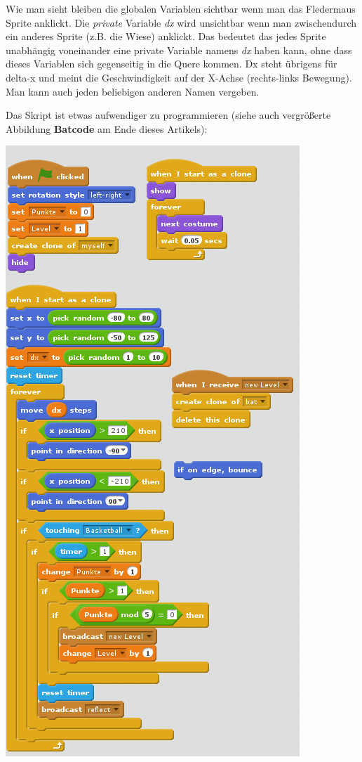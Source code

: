 \documentclass[10pt,a4paper,ngerman,twoside]{article} %
\begin{document}
\begin{multicols}{3}
Wie man sieht bleiben die globalen Variablen sichtbar wenn man das Fledermaus Sprite anklickt. Die \textit{private} Variable \textit{dx} wird unsichtbar wenn man zwischendurch ein anderes Sprite (z.B. die Wiese) anklickt. Das bedeutet das jedes Sprite unabhängig voneinander eine private Variable namens \textit{dx} haben kann, ohne dass dieses Variablen sich gegenseitig in die Quere kommen. Dx steht übrigens für delta-x und meint die Geschwindigkeit auf der X-Achse (rechts-links Bewegung). Man kann auch jeden beliebigen anderen Namen vergeben.

Das Skript ist etwas aufwendiger zu programmieren (siehe auch vergrößerte Abbildung \textbf{Batcode} am Ende dieses Artikels):

\begin{center}
\includegraphics[width=\linewidth]{scratch/fbatcode.png}

\end{center}
\end{multicols}
\end{document}
